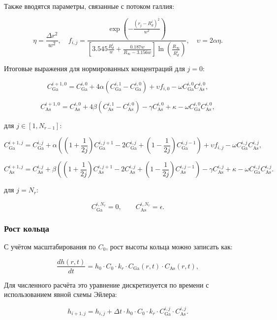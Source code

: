 \documentclass[14pt,oneside]{extarticle}
\begin{document}
Также вводятся параметры, связанные с потоком галлия:

\[
\eta = \frac{\Delta r^2}{w^2}, \quad
f_{i,j} = \frac{\exp\left( -\frac{(r_j - R_d^i)^2}{w^2} \right)}
{\left[3.545 \frac{R_d^i}{w} + \frac{0.187 w}{R_\infty - 3.156 w}\right] \ln\left( \frac{R_\infty}{R_d^i} \right)}, \quad
\upsilon = 2 \alpha \eta.
\]

Итоговые выражения для нормированных концентраций для $j=0$:

\[
C_{\text{Ga}}^{i+1,0} = C_{\text{Ga}}^{i,0}
+ 4 \alpha (C_{\text{Ga}}^{i,1} - C_{\text{Ga}}^{i,0})
+ \upsilon f_{i,0}
- \omega C_{\text{Ga}}^{i,0} C_{\text{As}}^{i,0},
\]

\[
C_{\text{As}}^{i+1,0} = C_{\text{As}}^{i,0}
+ 4 \beta (C_{\text{As}}^{i,1} - C_{\text{As}}^{i,0})
- \gamma C_{\text{As}}^{i,0}
+ \kappa
- \omega C_{\text{Ga}}^{i,0} C_{\text{As}}^{i,0},
\]

для $j\in\left[1,N_{r-1}\right]$:

\[
C_{\text{Ga}}^{i+1,j} = C_{\text{Ga}}^{i,j}
+ \alpha \left( \left(1+\frac{1}{2j}\right) C_{\text{Ga}}^{i,j+1}
- 2 C_{\text{Ga}}^{i,j}
+ \left(1-\frac{1}{2j}\right) C_{\text{Ga}}^{i,j-1} \right)
+ \upsilon f_{i,j}
- \omega C_{\text{Ga}}^{i,j} C_{\text{As}}^{i,j},
\]

\[
C_{\text{As}}^{i+1,j} = C_{\text{As}}^{i,j}
+ \beta \left( \left(1+\frac{1}{2j}\right) C_{\text{As}}^{i,j+1}
- 2 C_{\text{As}}^{i,j}
+ \left(1-\frac{1}{2j}\right) C_{\text{As}}^{i,j-1} \right)
- \gamma C_{\text{As}}^{i,j}
+ \kappa
- \omega C_{\text{Ga}}^{i,j} C_{\text{As}}^{i,j}.
\]

для $j=N_{r}$:

\[
C_{\text{Ga}}^{i,N_r} = 0, \qquad C_{\text{As}}^{i,N_r} = \epsilon.
\]

\subsubsection{Рост кольца}

С учётом масштабирования по \( C_0 \), рост высоты кольца можно записать как:

\begin{equation}
\frac{d h(r,t)}{d t} = h_0 \cdot C_0 \cdot k_r \cdot C_{\text{Ga}}(r,t) \cdot C_{\text{As}}(r,t),
\end{equation}

Для численного расчёта это уравнение дискретизуется по времени с использованием явной схемы Эйлера:

\begin{equation}
h_{i+1,j} = h_{i,j} + \Delta t \cdot h_0 \cdot C_0 \cdot k_r \cdot C_{\text{Ga}}^{i,j} \cdot C_{\text{As}}^{i,j}.
\end{equation}
\end{document}
